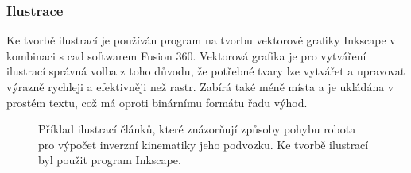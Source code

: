 \documentclass[a4paper, 12pt, twoside]{article}
\begin{document}
  \subsubsection{Ilustrace} \label{sec:Ilustrace}
  Ke tvorbě ilustrací je používán program na tvorbu vektorové grafiky Inkscape v kombinaci s \gls{cad} softwarem Fusion 360. Vektorová grafika je pro vytváření ilustrací správná volba z toho důvodu, že potřebné tvary lze vytvářet a upravovat výrazně rychleji a efektivněji než rastr. Zabírá také méně místa a je ukládána v prostém textu, což má oproti binárnímu formátu řadu výhod.

  \begin{figure}[H]
    \centering

    \hfill
    \hfill

    \caption[Příklad ilustrací článků]{Příklad ilustrací článků, které znázorňují způsoby pohybu robota pro výpočet inverzní kinematiky jeho podvozku. Ke tvorbě ilustrací byl použit program Inkscape.}%
    \label{img:Příklad ilustrací článků}%
  \end{figure}
\end{document}
